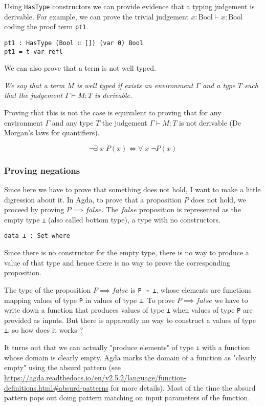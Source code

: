 \documentclass{article}
\begin{document}
Using \texttt{HasType} constructors we can provide evidence that a typing judgement is derivable.
For example, we can prove the trivial judgement $x : \text{Bool} \vdash x : \text{Bool}$ coding the proof term \texttt{pt1}.

\begin{verbatim}
pt1 : HasType (Bool ∷ []) (var 0) Bool
pt1 = t-var refl
\end{verbatim}

We can also prove that a term is not well typed.

\vspace{1em}
\textit{We say that a term $M$ is well typed if exists an environment $\Gamma$ and a type $T$ such that the judgement $\Gamma \vdash M : T$ is derivable.}
\vspace{1em}

Proving that this is not the case is equivalent to proving that for any environment $\Gamma$ and any type $T$ the judgement $\Gamma \vdash M : T$ is not derivable (De Morgan’s laws for quantifiers).

\[
\neg \exists \; x \; P(x) \iff \forall \; x \; \neg P(x)
\]

\begin{tcolorbox}
\subsubsection*{Proving negations}

Since here we have to prove that something does not hold, I want to make a little digression about it.
In Agda, to prove that a proposition $P$ does not hold, we proceed by proving $P \implies false$.
The $false$ proposition is represented as the empty type \texttt{⊥} (also called bottom type), a type with no constructors.

\begin{verbatim}
data ⊥ : Set where
\end{verbatim}

Since there is no constructor for the empty type, there is no way to produce a value of that type and hence there is no way to prove the corresponding proposition.

The type of the proposition $P \implies false$ is \texttt{P → ⊥}, whose elements are functions mapping values of type \texttt{P} in values of type \texttt{⊥}.
To prove $P \implies false$ we have to write down a function that produces values of type \texttt{⊥} when values of type \texttt{P} are provided as inputs.
But there is apparently no way to construct a values of type \texttt{⊥}, so how does it works ?

It turns out that we can actually "produce elements" of type \texttt{⊥} with a function whose domain is clearly empty.
Agda marks the domain of a function as "clearly empty" using the absurd pattern (see \url{https://agda.readthedocs.io/en/v2.5.2/language/function-definitions.html#absurd-patterns} for more details).
Most of the time the absurd pattern pops out doing pattern matching on input parameters of the function.


\end{tcolorbox}
\end{document}
